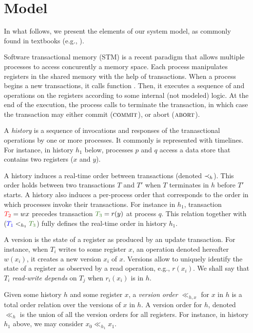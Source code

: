 \section{Model}

In what follows, we present the elements of our system model, as commonly found in textbooks (e.g., \cite{}).

Software transactional memory (STM) is a recent paradigm that allows multiple processes to access concurently a memory space.
Each process manipulates registers in the shared memory with the help of transactions.
When a process begins a new transactions, it calls function \stmBeginFunction.
Then, it executes a sequence of \stmReadFunction and \stmWriteFunction operations on the registers according to some internal (not modeled) logic.
At the end of the execution, the process calls \stmTryCommitFunction to terminate the transaction, in which case the transaction may either commit ($\text{\textsc{commit}}$), or abort ($\text{\textsc{abort}}$).

A \emph{history} is a sequence of invocations and responses of the tranasctional operations by one or more processes.
It commonly is represented with timelines.
For instance, in history $h_1$ below, processes $p$ and $q$ access a data store that contains two registers ($x$ and $y$).



A history induces a real-time order between transactions (denoted $\hb_h$).
This order holds between two transactions $T$ and $T'$ when $T$ terminates in $h$ before $T'$ starts.
A history also induces a per-process order that corresponds to the order in which processes invoke their transactions.
For instance in $h_1$, transaction ${\color{red}{T_2}}=w{x}$ precedes transaction ${\color{OliveGreen}{T_3}}=r(y)$ at process $q$.
This relation together with (${\color{blue}{T_1}} <_{h_1} {\color{OliveGreen}{T_3}}$) fully defines the real-time order in history $h_1$.

A version is the state of a register as produced by an update transaction.
For instance, when $T_i$ writes to some register $x$, an operation denoted hereafter $w(x_i)$, it creates a new version $x_i$ of $x$.
Versions allow to uniquely identify the state of a register as observed by a read operation, e.g., $r(x_i)$.
We shall say that $T_i$ \emph{read-write depends} on $T_j$ when $r_i(x_i)$ is in $h$.

Given some history $h$ and some register $x$, a \emph{version order} $\ll_{h,x}$ for $x$ in $h$ is a total order relation over the versions of $x$ in $h$.
A version order for $h$, denoted $\ll_{h}$ is the union of all the version orders for all registers.
For instance, in history $h_1$ above,  we may consider $x_0 \ll_{h_1} x_1$.

